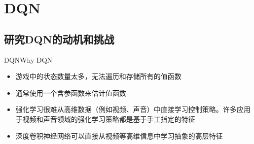 \documentclass[10pt]{beamer}
\begin{document}
%			
%			
%			
%			
%
	
	\section{DQN}
	
	\subsection{研究DQN的动机和挑战}
	
	\begin{frame}{DQN}{Why DQN}
		\begin{itemize}
			\item<2-> 游戏中的状态数量太多，无法遍历和存储所有的值函数
			
			\item<3-> 通常使用一个含参函数来估计值函数
			
			\item<4-> 强化学习很难从高维数据（例如视频、声音）中直接学习控制策略。许多应用于视频和声音领域的强化学习策略都是基于手工指定的特征
			
			\item<5-> 深度卷积神经网络可以直接从视频等高维信息中学习抽象的高层特征
		\end{itemize}
	\end{frame}
\end{document}

